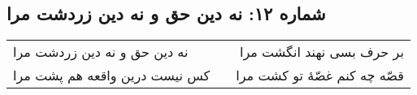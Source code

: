 \begin{center}
\section*{شماره ۱۲: نه دین حق و نه دین زردشت مرا}
\label{sec:012}
\begin{longtable}{l p{0.5cm} r}
نه دین حق و نه دین زردشت مرا
&&
بر حرف بسی نهند انگشت مرا
\\
کس نیست درین واقعه هم پشت مرا
&&
قصّه چه کنم غصّهٔ تو کشت مرا
\\
\end{longtable}
\end{center}

